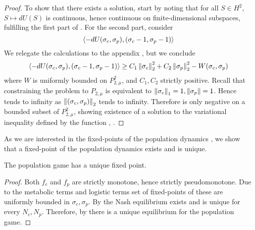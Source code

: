 \begin{proof}
  To show that there exists a solution, start by noting that for all $S\in H^2$, $S\mapsto dU(S)$ is continuous, hence continuous on finite-dimensional subspaces, fulfilling the first part of . For the second part, consider
  \begin{equation}
    \label{eq:du}
    \left \langle -dU(\sigma_c,\sigma_p),(\sigma_c-1, \sigma_p-1) \right \rangle
  \end{equation}
  We relegate the calculations to the appendix , but we conclude
  \begin{equation}
    \label{eq:fin_exist}
    \left \langle -dU(\sigma_c,\sigma_p),(\sigma_c-1, \sigma_p-1) \right \rangle \geq C_1\left \Vert \sigma_c \right \Vert_2^2 + C_2\left \Vert \sigma_p \right \Vert_2^2 - W(\sigma_c,\sigma_p)
  \end{equation}
  where $W$ is uniformly bounded on $P_{2,\mu}^2$, and $C_1,C_2$ strictly positive. Recall that constraining the problem to $P_{2,\mu}$ is equivalent to $\left \Vert \sigma_c \right \Vert_1 = 1, \left \Vert \sigma_p \right \Vert = 1$. Hence  tends to infinity as $\left \Vert (\sigma_c,\sigma_p) \right \Vert_2$ tends to infinity. Therefore  is only negative on a bounded subset of $P^2_{2,\mu}$, showing existence of a solution to the variational inequality defined by the function , .

\end{proof}
As we are interested in the fixed-points of the population dynamics , we show that a fixed-point of the population dynamics exists and is unique.
\begin{corollary}
  The population game  has a unique fixed point.
\end{corollary}
\begin{proof}
Both $f_c$ and $f_p$ are strictly monotone, hence strictly pseudomonotone. Due to the metabolic terms and logistic terms set of fixed-points of these are uniformly bounded in $\sigma_c, \sigma_p$. By  the Nash equilibrium exists and is unique for every $N_c, N_p$. Therefore, by  there is a unique equilibrium for the population game.%
\end{proof}
